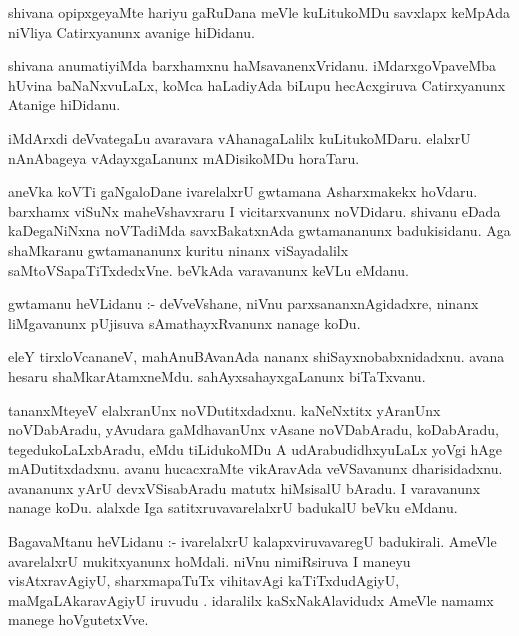 \documentclass{article}
\begin{document}
\begin{mn}
shivana  opipxgeyaMte  hariyu  gaRuDana  meVle  kuLitukoMDu  savxlapx  keMpAda  niVliya  Catirxyanunx  
avanige  hiDidanu.
\end{mn}

\begin{mn}
shivana  anumatiyiMda  barxhamxnu  haMsavanenxVridanu.  iMdarxgoVpaveMba  hUvina  baNaNxvuLaLx,  koMca  
haLadiyAda  biLupu  hecAcxgiruva  Catirxyanunx  Atanige  hiDidanu.
\end{mn}

\begin{mn}
iMdArxdi  deVvategaLu  avaravara  vAhanagaLalilx  kuLitukoMDaru.  elalxrU  nAnAbageya  vAdayxgaLanunx  
mADisikoMDu  horaTaru.
\end{mn}

\begin{mn}
aneVka  koVTi  gaNgaloDane  ivarelalxrU  gwtamana  Asharxmakekx  hoVdaru.  barxhamx viSuNx maheVshavxraru  
I  vicitarxvanunx  noVDidaru.  shivanu  eDada  kaDegaNiNxna  noVTadiMda  savxBakatxnAda  gwtamananunx  
badukisidanu.  Aga  shaMkaranu  gwtamananunx  kuritu  ninanx  viSayadalilx  saMtoVSapaTiTxdedxVne.  beVkAda  
varavanunx  keVLu  eMdanu.
\end{mn}

\begin{mn}
gwtamanu  heVLidanu :- deVveVshane,  niVnu  parxsananxnAgidadxre,  ninanx  liMgavanunx  pUjisuva  
sAmathayxRvanunx  nanage  koDu.
\end{mn}

\begin{mn}
eleY  tirxloVcananeV,  mahAnuBAvanAda  nananx  shiSayxnobabxnidadxnu.  avana  hesaru  shaMkarAtamxneMdu.  
sahAyxsahayxgaLanunx  biTaTxvanu.
\end{mn}

\begin{mn}
tananxMteyeV  elalxranUnx  noVDutitxdadxnu.  kaNeNxtitx  yAranUnx  noVDabAradu,  yAvudara  gaMdhavanUnx  vAsane  
noVDabAradu,  koDabAradu,  tegedukoLaLxbAradu,  eMdu  tiLidukoMDu  A  udArabudidhxyuLaLx  yoVgi  hAge  mADutitxdadxnu.  
avanu  hucacxraMte  vikAravAda  veVSavanunx  dharisidadxnu.  avananunx  yArU  devxVSisabAradu  matutx  hiMsisalU  bAradu.  
I  varavanunx  nanage  koDu.  alalxde  Iga  satitxruvavarelalxrU  badukalU  beVku  eMdanu.
\end{mn}

\begin{mn}
BagavaMtanu  heVLidanu :- ivarelalxrU  kalapxviruvavaregU  badukirali.  AmeVle  avarelalxrU  mukitxyanunx  
hoMdali.  niVnu  nimiRsiruva  I  maneyu  visAtxravAgiyU,  sharxmapaTuTx  vihitavAgi  kaTiTxdudAgiyU,  
maMgaLAkaravAgiyU  iruvudu .  idaralilx  kaSxNakAlavidudx  AmeVle  namamx  manege  hoVgutetxVve.
\end{mn}
\end{document}
